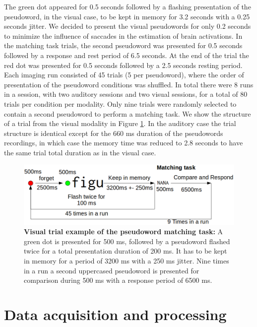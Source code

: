 The green dot appeared for 0.5 seconds followed by a flashing presentation of the pseudoword, in the visual case, to be kept in memory for 3.2 seconds with a 0.25 seconds jitter.
We decided to present the visual pseudowords for only 0.2 seconds to minimize the influence of saccades in the estimation of brain activations.
In the matching task trials, the second pseudoword was presented for 0.5 seconds followed by a response and rest period of 6.5 seconds.
At the end of the trial the red dot was presented for 0.5 seconds followed by a 2.5 seconds resting period.
Each imaging run consisted of 45 trials (5 per pseudoword), where the order of presentation of the pseudoword conditions was shuffled.
In total there were 8 runs in a session, with two auditory sessions and two visual sessions, for a total of 80 trials per condition per modality.
Only nine trials were randomly selected to contain a second pseudoword to perform a matching task.
We show the structure of a trial from the visual modality in Figure \ref{fig:syllable_trial}.
In the auditory case the trial structure is identical except for the 660 ms duration of the pseudowords recordings, in which case the memory time was reduced to 2.8 seconds to have the same trial total duration as in the visual case.


\begin{figure}[hptb]
\centering
\includegraphics[width=1.0 \linewidth]{figures/part_II/syllable_trial.png}
\caption{\textbf{Visual trial example of the pseudoword matching task:}
A green dot is presented for 500 ms, followed by a pseudoword flashed twice for a total presentation duration of 200 ms.
It has to be kept in memory for a period of 3200 ms with a 250 ms jitter.
Nine times in a run a second uppercased pseudoword is presented for comparison during 500 ms with a response period of 6500 ms.
}
\label{fig:syllable_trial}
\end{figure}


\section{Data acquisition and processing}

